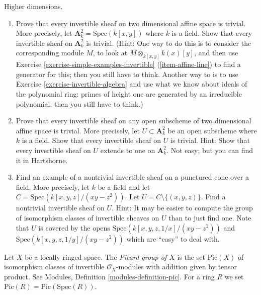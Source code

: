 \begin{exercise}
\label{exercise-higher-dimension-invertible}
Higher dimensions.
\begin{enumerate}
\item Prove that every invertible sheaf on two dimensional
affine space is trivial. More precisely, let
${\mathbf A}^2_k = \text{Spec}(k[x, y])$ where $k$ is a field.
Show that every invertible sheaf on ${\mathbf A}^2_k$ is trivial.
(Hint: One way to do this is to consider the corresponding
module $M$, to look at $M \otimes_{k[x, y]} k(x)[y]$, and
then use
Exercise \ref{exercise-simple-examples-invertible} (\ref{item-affine-line})
to find a generator for this; then you still have to think.
Another way to is to use
Exercise \ref{exercise-invertible-algebra}
and use what we know about ideals of the
polynomial ring: primes of height one are generated by an irreducible
polynomial; then you still have to think.)
\item Prove that every invertible sheaf on any open
subscheme of two dimensional affine space is trivial. More precisely, let
$U \subset {\mathbf A}^2_k$ be an open subscheme where $k$ is a field.
Show that every invertible sheaf on $U$ is trivial. Hint: Show that every
invertible sheaf on $U$ extends to one on ${\mathbf A}^2_k$. Not easy;
but you can find it in Hartshorne.
\item Find an example of a nontrivial
invertible sheaf on a punctured cone over a field. More
precisely, let $k$ be a field and let $C = \text{Spec}(k[x, y, z]/(xy-z^2))$.
Let $U = C \setminus \{ (x, y, z) \}$. Find a nontrivial
invertible sheaf on $U$. Hint: It may be easier to compute the
group of isomorphism classes of invertible sheaves on $U$ than to
just find one. Note that $U$ is covered by the opens
$\text{Spec}(k[x, y, z, 1/x]/(xy-z^2))$ and
$\text{Spec}(k[x, y, z, 1/y]/(xy-z^2))$
which are ``easy'' to deal with.
\end{enumerate}
\end{exercise}

\begin{definition}
\label{definition-picard-group}
Let $X$ be a locally ringed space.
The {\it Picard group of $X$} is the set $\text{Pic}(X)$
of isomorphism classes of invertible $\mathcal{O}_X$-modules
with addition given by tensor product.
See Modules, Definition \ref{modules-definition-pic}.
For a ring $R$ we set $\text{Pic}(R) = \text{Pic}(\text{Spec}(R))$.
\end{definition}

